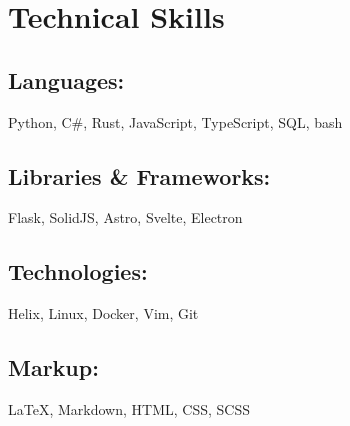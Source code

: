\section{Technical Skills}

\subsection{Languages:} Python, C\#, Rust, JavaScript, TypeScript, SQL, bash
\subsection{Libraries \& Frameworks:} Flask, SolidJS, Astro, Svelte, Electron
\subsection{Technologies:} Helix, Linux, Docker, Vim, Git
\subsection{Markup:} {\LaTeX}, Markdown, HTML, CSS, SCSS
